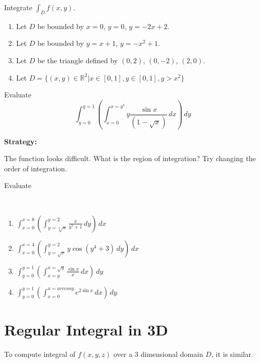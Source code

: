 \begin{exercise}
    Integrate $\int_D f(x, y)$. 

    \begin{enumerate}
        \item Let $D$ be bounded by $x = 0$, $y = 0$, $y = -2x + 2$. 
        \item Let $D$ be bounded by $y = x + 1$, $y = -x^2 + 1$.
        \item Let $D$ be the triangle defined by $(0, 2)$, $(0, -2)$, $(2, 0)$.
        \item Let $D = \{ (x, y) \in \mathbb{R}^2 | x \in [0, 1], y \in [0, 1], y > x^2 \}$
    \end{enumerate}
\end{exercise}

\begin{exercise}
    Evaluate $$\int_{y=0}^{y=1} \left( \int_{x=0}^{x=y^4} y \frac{\sin{x}}{(1 - \sqrt{x})} \,dx \right) \,dy$$

    \textbf{Strategy:}

    The function looks difficult. What is the region of integration? Try changing the order of integration.
\end{exercise}

\begin{exercise}
    Evaluate

    {~~~}

    \begin{enumerate}
        \item $\int_{x=0}^{x=8} \left( \int_{y=\sqrt[3]{x}}^{y=2} \frac{x}{y^7 +1} \,dy \right) \,dx$
        \item $\int_{x=0}^{x=4} \left( \int_{y=\sqrt{x}}^{y=2} y \cos(y^4 + 3) \,dy \right) \,dx$
        \item $\int_{y=0}^{y=1} \left( \int_{x=y}^{x=\sqrt{y}} \frac{\sin{x}}{x} \,dx \right) \,dy$
        \item $\int_{y=0}^{y=1} \left( \int_{x=0}^{x=arccos{y}} e^{2\sin{x}} \,dx \right) \,dy$
    \end{enumerate}
\end{exercise}

\section{Regular Integral in 3D}

To compute integral of $f(x,y,z)$ over a 3 dimensional domain $D$, it is similar.

